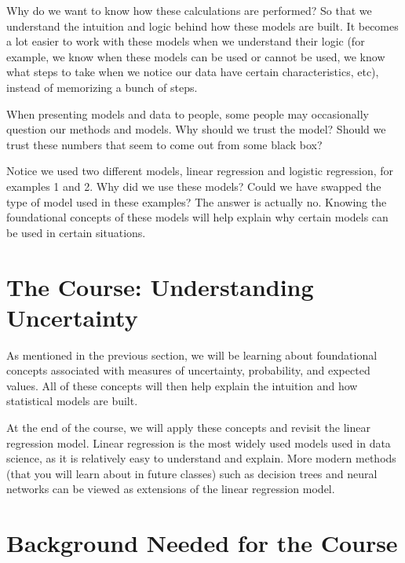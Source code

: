 \documentclass[
]{book}
\begin{document}
Why do we want to know how these calculations are performed? So that we understand the intuition and logic behind how these models are built. It becomes a lot easier to work with these models when we understand their logic (for example, we know when these models can be used or cannot be used, we know what steps to take when we notice our data have certain characteristics, etc), instead of memorizing a bunch of steps.

When presenting models and data to people, some people may occasionally question our methods and models. Why should we trust the model? Should we trust these numbers that seem to come out from some black box?

Notice we used two different models, linear regression and logistic regression, for examples 1 and 2. Why did we use these models? Could we have swapped the type of model used in these examples? The answer is actually no. Knowing the foundational concepts of these models will help explain why certain models can be used in certain situations.

\hypertarget{the-course-understanding-uncertainty}{%
\section*{The Course: Understanding Uncertainty}\label{the-course-understanding-uncertainty}}

As mentioned in the previous section, we will be learning about foundational concepts associated with measures of uncertainty, probability, and expected values. All of these concepts will then help explain the intuition and how statistical models are built.

At the end of the course, we will apply these concepts and revisit the linear regression model. Linear regression is the most widely used models used in data science, as it is relatively easy to understand and explain. More modern methods (that you will learn about in future classes) such as decision trees and neural networks can be viewed as extensions of the linear regression model.

\hypertarget{background-needed-for-the-course}{%
\section*{Background Needed for the Course}\label{background-needed-for-the-course}}
\end{document}
